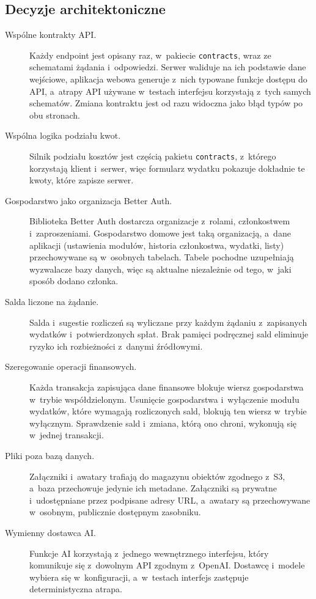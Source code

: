 \subsection{Decyzje architektoniczne}

\begin{description}
  \item[Wspólne kontrakty API.] Każdy endpoint jest opisany raz, w~pakiecie \texttt{contracts}, wraz ze schematami żądania i~odpowiedzi. Serwer waliduje na ich podstawie dane wejściowe, aplikacja webowa generuje z~nich typowane funkcje dostępu do API, a~atrapy API używane w~testach interfejsu korzystają z~tych samych schematów. Zmiana kontraktu jest od razu widoczna jako błąd typów po obu stronach.
  \item[Wspólna logika podziału kwot.] Silnik podziału kosztów jest częścią pakietu \texttt{contracts}, z~którego korzystają klient i~serwer, więc formularz wydatku pokazuje dokładnie te kwoty, które zapisze serwer.
  \item[Gospodarstwo jako organizacja Better Auth.] Biblioteka Better Auth dostarcza organizacje z~rolami, członkostwem i~zaproszeniami. Gospodarstwo domowe jest taką organizacją, a~dane aplikacji (ustawienia modułów, historia członkostwa, wydatki, listy) przechowywane są w~osobnych tabelach. Tabele pochodne uzupełniają wyzwalacze bazy danych, więc są aktualne niezależnie od tego, w~jaki sposób dodano członka.
  \item[Salda liczone na żądanie.] Salda i~sugestie rozliczeń są wyliczane przy każdym żądaniu z~zapisanych wydatków i~potwierdzonych spłat. Brak pamięci podręcznej sald eliminuje ryzyko ich rozbieżności z~danymi źródłowymi.
  \item[Szeregowanie operacji finansowych.] Każda transakcja zapisująca dane finansowe blokuje wiersz gospodarstwa w~trybie współdzielonym. Usunięcie gospodarstwa i~wyłączenie modułu wydatków, które wymagają rozliczonych sald, blokują ten wiersz w~trybie wyłącznym. Sprawdzenie sald i~zmiana, którą ono chroni, wykonują się w~jednej transakcji.
  \item[Pliki poza bazą danych.] Załączniki i~awatary trafiają do magazynu obiektów zgodnego z~S3, a~baza przechowuje jedynie ich metadane. Załączniki są prywatne i~udostępniane przez podpisane adresy URL, a~awatary są przechowywane w~osobnym, publicznie dostępnym zasobniku.
  \item[Wymienny dostawca AI.] Funkcje AI korzystają z~jednego wewnętrznego interfejsu, który komunikuje się z~dowolnym API zgodnym z~OpenAI. Dostawcę i~modele wybiera się w~konfiguracji, a~w~testach interfejs zastępuje deterministyczna atrapa.
\end{description}

